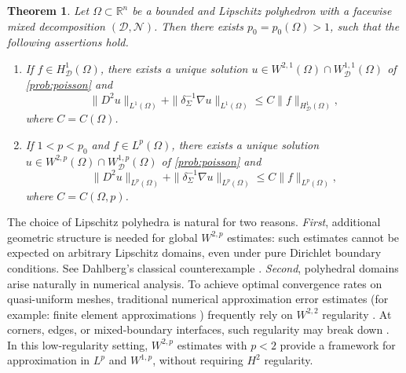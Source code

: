 \documentclass[12pt]{amsart}
\newtheorem{theorem}{Theorem}[section]
\numberwithin{equation}{section}
\newcommand{\bR}{\mathbb{R}}
\newcommand\cD{\mathcal{D}}
\newcommand\cN{\mathcal{N}}
\begin{document}
\begin{theorem}
 \label{thm:poisson-polyhedron}
 Let $\Omega\subset\bR^n$ be a bounded and Lipschitz polyhedron with a
 facewise mixed decomposition $(\cD,\cN)$. Then there exists $p_0 = p_0(\Omega)>1$, such that
 the following assertions hold.
 \begin{enumerate}
  \item If $f\in H^1_{\cD}(\Omega)$, there exists a unique solution $u\in W^{2,1}(\Omega)\cap W^{1,1}_{\cD}(\Omega)$ of \eqref{prob:poisson}
  and
  \begin{equation}
   \|D^2u\|_{L^1(\Omega)}
   +\|\delta_\Sigma^{-1}\nabla u\|_{L^1(\Omega)}
   \leq C\|f\|_{H^1_{\cD}(\Omega)},
   \label{eq:polyhedral-hardy-endpoint}
  \end{equation}
   where $C=C(\Omega)$.
  \item If $1<p<p_0$ and $f\in L^p(\Omega)$, there exists a unique
  solution $u\in W^{2,p}(\Omega)\cap W^{1,p}_{\cD}(\Omega)$ of \eqref{prob:poisson}
  and
  \begin{equation}
   \|D^2u\|_{L^p(\Omega)}
   +\|\delta_\Sigma^{-1}\nabla u\|_{L^p(\Omega)}
   \leq C\|f\|_{L^p(\Omega)},
   \label{eq:polyhedral-Lp-estimate}
  \end{equation}
   where $C=C(\Omega,p)$.
 \end{enumerate}
\end{theorem}






The choice of Lipschitz polyhedra is natural for two reasons. \textit{First}, additional geometric structure is needed for global $W^{2,p}$ estimates: such estimates cannot be expected on arbitrary Lipschitz domains, even under pure Dirichlet boundary conditions. See Dahlberg's classical counterexample \cite{MR544584}. \textit{Second}, polyhedral domains arise naturally in numerical analysis. To achieve optimal convergence rates on quasi-uniform meshes, traditional numerical approximation error estimates (for example: finite element approximations \cite{MR1930132}) frequently rely on $W^{2,2}$ regularity \cite{MR2373954}. At corners, edges, or mixed-boundary interfaces, such regularity may break down \cite[Examples~5.5.2 and~5.5.4]{MR2373954}. In this low-regularity setting, $W^{2,p}$ estimates with $p<2$ provide a framework for approximation in $L^p$ and $W^{1,p}$, without requiring $H^2$ regularity.


\medskip
\end{document}
